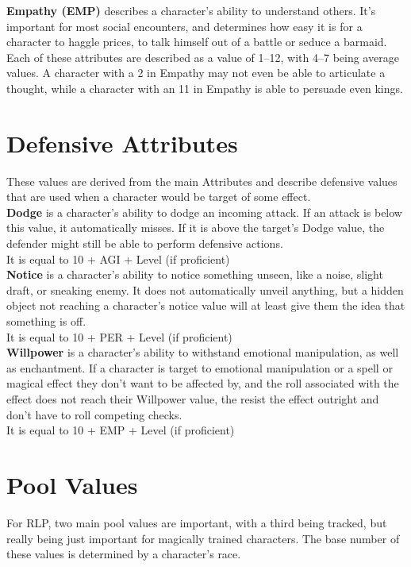 \textbf{Empathy (EMP)}\label{stat:empathy} describes a character's ability to understand others.
It's important for most social encounters, and determines how easy it is for a character to haggle prices, to talk himself out of a battle or seduce a barmaid.\\
Each of these attributes are described as a value of 1--12, with 4--7 being average values.
A character with a 2 in Empathy may not even be able to articulate a thought, while a character with an 11 in Empathy is able to persuade even kings.

\section{Defensive Attributes}\label{sec:defensiveStats}
These values are derived from the main Attributes and describe defensive values that are used when a character would be target of some effect.\\


\textbf{Dodge}\label{stat:dodge} is a character's ability to dodge an incoming attack.
If an attack is below this value, it automatically misses.
If it is above the target's Dodge value, the defender might still be able to perform defensive actions.\\
It is equal to 10 + AGI + Level (if proficient)\\


\textbf{Notice}\label{stat:notice} is a character's ability to notice something unseen, like a noise, slight draft, or sneaking enemy.
It does not automatically unveil anything, but a hidden object not reaching a character's notice value will at least give them the idea that something is off.\\
It is equal to 10 + PER + Level (if proficient)\\


\textbf{Willpower}\label{stat:willpower} is a character's ability to withstand emotional manipulation, as well as enchantment.
If a character is target to emotional manipulation or a spell or magical effect they don't want to be affected by, and the roll associated with the effect does not reach their Willpower value, the resist the effect outright and don't have to roll competing checks.\\
It is equal to 10 + EMP + Level (if proficient)\\


\section{Pool Values}\label{sec:pools}
For RLP, two main pool values are important, with a third being tracked, but really being just important for magically trained characters.
The base number of these values is determined by a character's race.\\


